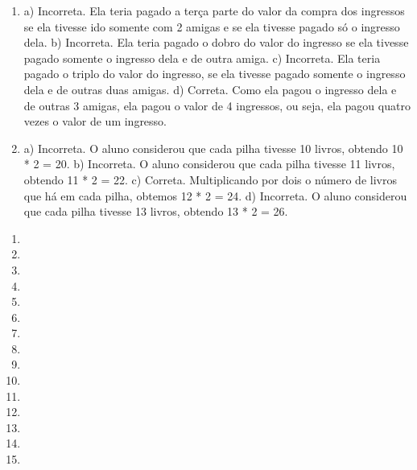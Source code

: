 \begin{enumerate}
\item
a) Incorreta. Ela teria pagado a terça parte do valor da compra dos ingressos se ela
tivesse ido somente com 2 amigas e se ela tivesse pagado só o ingresso
dela.
b) Incorreta. Ela teria pagado o dobro do valor do ingresso se ela
tivesse pagado somente o ingresso dela e de outra amiga.
c) Incorreta. Ela teria pagado o triplo do valor do ingresso, se ela
tivesse pagado somente o ingresso dela e de outras duas amigas.
d) Correta. Como ela pagou o ingresso dela e de outras 3 amigas, ela
pagou o valor de 4 ingressos, ou seja, ela pagou quatro vezes o valor de um ingresso.

\item
a) Incorreta. O aluno considerou que cada pilha tivesse 10 livros, obtendo 10 * 2 = 20.
b) Incorreta. O aluno considerou que cada pilha tivesse 11 livros, obtendo 11 * 2 = 22.
c) Correta. Multiplicando por dois o número de livros que há em cada pilha, obtemos 12 * 2 = 24.
d) Incorreta. O aluno considerou que cada pilha tivesse 13 livros, obtendo 13 * 2 = 26.
\end{enumerate}


\begin{enumerate}
\item

\item

\item

\item

\item

\item

\item

\item

\item

\item

\item

\item

\item

\item

\item
\end{enumerate}

